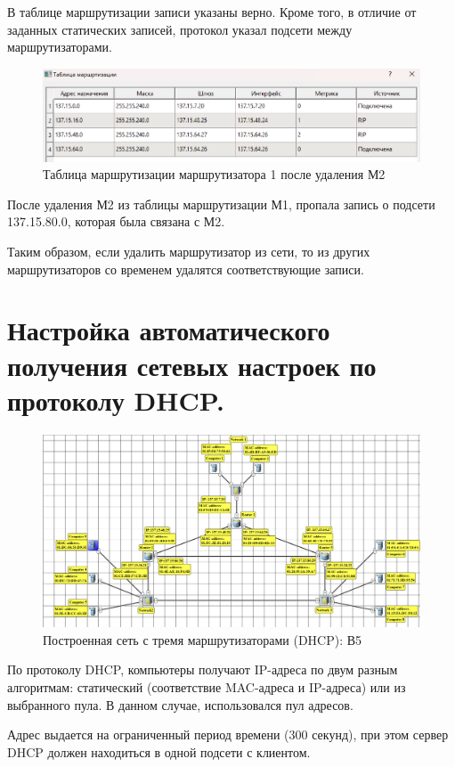 \documentclass[12pt,onecolumn]{article}
\begin{document}
В таблице маршрутизации записи указаны верно. Кроме того, в отличие от
заданных статических записей, протокол указал подсети между
маршрутизаторами.

\begin{figure}[H]
    \centering
    \includegraphics[width=\textwidth]{image/part-4/router1-after.png}
    \caption{Таблица маршрутизации маршрутизатора 1 после удаления М2}
\end{figure}

После удаления М2 из таблицы маршрутизации М1, пропала запись о подсети 137.15.80.0, которая была связана с М2.

Таким образом, если удалить маршрутизатор из сети, то из других
маршрутизаторов со временем удалятся соответствующие записи.

\section{Настройка автоматического получения сетевых настроек по протоколу DHCP.}
\begin{figure}
    \centering
    \includegraphics[width=\textwidth]{image/part-4/net5.png}
    \caption{Построенная сеть с тремя маршрутизаторами (DHCP): В5}
\end{figure}
По протоколу DHCP, компьютеры получают IP-адреса по двум разным алгоритмам: статический (соответствие MAC-адреса и IP-адреса) или из выбранного пула. В данном случае, использовался пул адресов.

Адрес выдается на ограниченный период времени (300 секунд), при этом сервер DHCP должен находиться в одной подсети с клиентом.
\end{document}
